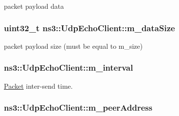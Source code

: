 packet payload data 

\subsubsection[{\texorpdfstring{m\+\_\+data\+Size}{m_dataSize}}]{\setlength{\rightskip}{0pt plus 5cm}uint32\+\_\+t ns3\+::\+Udp\+Echo\+Client\+::m\+\_\+data\+Size\hspace{0.3cm}{\ttfamily [private]}}\hypertarget{classns3_1_1UdpEchoClient_aea0cf40ebfcf21668f3c341d78877f57}{}\label{classns3_1_1UdpEchoClient_aea0cf40ebfcf21668f3c341d78877f57}


packet payload size (must be equal to m\+\_\+size) 

\subsubsection[{\texorpdfstring{m\+\_\+interval}{m_interval}}]{ ns3\+::\+Udp\+Echo\+Client\+::m\+\_\+interval\hspace{0.3cm}{\ttfamily [private]}}\hypertarget{classns3_1_1UdpEchoClient_a15b358eed30957c2f6febcb989b1eb59}{}\label{classns3_1_1UdpEchoClient_a15b358eed30957c2f6febcb989b1eb59}


\hyperlink{classns3_1_1Packet}{Packet} inter-\/send time. 

\subsubsection[{\texorpdfstring{m\+\_\+peer\+Address}{m_peerAddress}}]{ ns3\+::\+Udp\+Echo\+Client\+::m\+\_\+peer\+Address\hspace{0.3cm}{\ttfamily [private]}}\hypertarget{classns3_1_1UdpEchoClient_a93144bb99de23e9e585a6208705b634d}{}\label{classns3_1_1UdpEchoClient_a93144bb99de23e9e585a6208705b634d}


